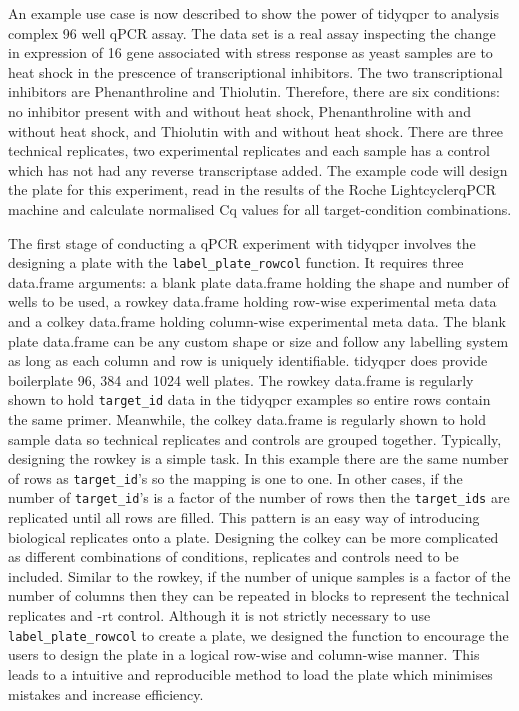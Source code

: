\documentclass{SBCbookchapter}
\begin{document}
An example use case is now described to show the power of tidyqpcr to analysis complex 96 well qPCR assay. The data set is a real assay inspecting the change in expression of 16 gene associated with stress response as yeast samples are to heat shock in the prescence of transcriptional inhibitors. The two transcriptional inhibitors are Phenanthroline and Thiolutin. Therefore, there are six conditions: no inhibitor present with and without heat shock, Phenanthroline with and without heat shock, and Thiolutin with and without heat shock. There are three technical replicates, two experimental replicates and each sample has a control which has not had any reverse transcriptase added. The example code will design the plate for this experiment, read in the results of the Roche LightcyclerqPCR machine and calculate normalised Cq values for all target-condition combinations.

The first stage of conducting a qPCR experiment with tidyqpcr involves the designing a plate with the \lstinline{label_plate_rowcol} function. It requires three data.frame arguments: a blank plate data.frame holding the shape and number of wells to be used, a rowkey data.frame holding row-wise experimental meta data and a colkey data.frame holding column-wise experimental meta data. The blank plate data.frame can be any custom shape or size and follow any labelling system as long as each column and row is uniquely identifiable. tidyqpcr does provide boilerplate 96, 384 and 1024 well plates. The rowkey data.frame is regularly shown to hold \lstinline{target_id} data in the tidyqpcr examples so entire rows contain the same primer. Meanwhile, the colkey data.frame is regularly shown to hold sample data so technical replicates and controls are grouped together. Typically, designing the rowkey is a simple task. In this example there are the same number of rows as \lstinline{target_id}'s so the mapping is one to one. In other cases, if the number of \lstinline{target_id}'s is a factor of the number of rows then the \lstinline{target_ids} are replicated until all rows are filled. This pattern is an easy way of introducing biological replicates onto a plate. Designing the colkey can be more complicated as different combinations of conditions, replicates and controls need to be included. Similar to the rowkey, if the number of unique samples is a factor of the number of columns then they can be repeated in blocks to represent the technical replicates and -rt control. Although it is not strictly necessary to use \lstinline{label_plate_rowcol} to create a plate, we designed the function to encourage the users to design the plate in a logical row-wise and column-wise manner. This leads to a intuitive and reproducible method to load the plate which minimises mistakes and increase efficiency. 
\end{document}
